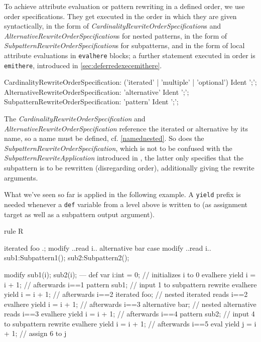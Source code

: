 To achieve attribute evaluation or pattern rewriting in a defined order, we use order specifications.
They get executed in the order in which they are given syntactically,
in the form of \emph{CardinalityRewriteOrderSpecification}s and \emph{AlternativeRewriteOrderSpecification}s for nested patterns,
in the form of \emph{SubpatternRewriteOrderSpecification}s for subpatterns,
and in the form of local attribute evaluations in \texttt{evalhere} blocks;
a further statement executed in order is \texttt{emithere}, introduced in \ref{sec:deferredexecemithere}. 

\begin{rail}  
  CardinalityRewriteOrderSpecification: 
    ('iterated' | 'multiple' | 'optional') Ident ';';
  AlternativeRewriteOrderSpecification: 
    'alternative' Ident ';';
  SubpatternRewriteOrderSpecification: 
    'pattern' Ident ';';
\end{rail}

The \emph{CardinalityRewriteOrderSpecification} and \emph{AlternativeRewriteOrderSpecification} reference the iterated or alternative by its name, so a name must be defined, cf. \ref{namednested}.
So does the \emph{SubpatternRewriteOrderSpecification}, which is not to be confused with the \emph{SubpatternRewriteApplication} introduced in \label{sec:subrule}, the latter only specifies that the subpattern is to be rewritten (disregarding order), additionally giving the rewrite arguments.

What we've seen so far is applied in the following example.
A \texttt{yield} prefix is needed whenever a \texttt{def} variable from a level above is written to (as assignment target as well as a subpattern output argument). 

\begin{example}
  \begin{grgen}
rule R {
  iterated foo { .; modify { ..read i.. } }
  alternative bar { case { modify { ..read i.. } } } 
  sub1:Subpattern1();
  sub2:Subpattern2();

  modify {
    sub1(i);
    sub2(i);
  ---
    def var i:int = 0; // initializes i to 0
    evalhere { yield i = i + 1; } // afterwards i==1
    pattern sub1; // input 1 to subpattern rewrite
    evalhere { yield i = i + 1; } // afterwards i==2
    iterated foo; // nested iterated reads i==2 
    evalhere { yield i = i + 1; } // afterwards i==3
    alternative bar; // nested alternative reads i==3
    evalhere { yield i = i + 1; } // afterwards i==4
    pattern sub2; // input 4 to subpattern rewrite
    evalhere { yield i = i + 1; } // afterwards i==5
    eval { yield j = i + 1; } // assign 6 to j
  }
}
  \end{grgen}
\end{example}

